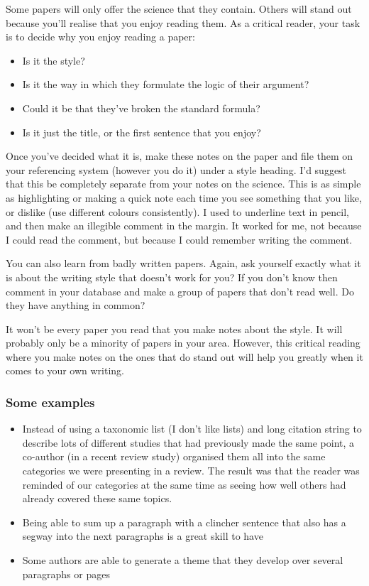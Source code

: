 \documentclass[
]{krantz}
\providecommand{\tightlist}{%
  \setlength{\itemsep}{0pt}\setlength{\parskip}{0pt}}
\begin{document}
Some papers will only offer the science that they contain. Others will stand out because you'll realise that you enjoy reading them. As a critical reader, your task is to decide why you enjoy reading a paper:

\begin{itemize}
\tightlist
\item
  Is it the style?
\item
  Is it the way in which they formulate the logic of their argument?
\item
  Could it be that they've broken the standard formula?
\item
  Is it just the title, or the first sentence that you enjoy?
\end{itemize}

Once you've decided what it is, make these notes on the paper and file them on your referencing system (however you do it) under a style heading. I'd suggest that this be completely separate from your notes on the science. This is as simple as highlighting or making a quick note each time you see something that you like, or dislike (use different colours consistently). I used to underline text in pencil, and then make an illegible comment in the margin. It worked for me, not because I could read the comment, but because I could remember writing the comment.

You can also learn from badly written papers. Again, ask yourself exactly what it is about the writing style that doesn't work for you? If you don't know then comment in your database and make a group of papers that don't read well. Do they have anything in common?

It won't be every paper you read that you make notes about the style. It will probably only be a minority of papers in your area. However, this critical reading where you make notes on the ones that do stand out will help you greatly when it comes to your own writing.

\hypertarget{some-examples}{%
\subsubsection{Some examples}\label{some-examples}}

\begin{itemize}
\item
  Instead of using a taxonomic list (I don't like lists) and long citation string to describe lots of different studies that had previously made the same point, a co-author (in a recent review study) organised them all into the same categories we were presenting in a review. The result was that the reader was reminded of our categories at the same time as seeing how well others had already covered these same topics.
\item
  Being able to sum up a paragraph with a clincher sentence that also has a segway into the next paragraphs is a great skill to have
\item
  Some authors are able to generate a theme that they develop over several paragraphs or pages
\end{itemize}
\end{document}
